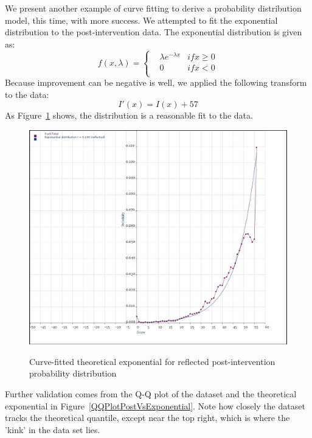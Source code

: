\documentclass[10pt]{article}
\begin{document}
We present another example of curve fitting to derive a probability distribution model, this time, with more success. We attempted to fit the exponential distribution to the post-intervention data. The exponential distribution is given as:
\[f(x,\lambda)=\left\{\begin{matrix}
 & {\lambda}e^{-{\lambda}x} &if x \geq 0\\ 
 & 0 &if x < 0\\
\end{matrix}\right.\]
Because improvement can be negative is well, we applied the following transform to the data:
\[I'(x)=I(x) + 57\]
As Figure~\ref{ExponentialProbabilityPost} shows, the distribution is a reasonable fit to the data.
\begin{figure}
\caption{Curve-fitted theoretical exponential for reflected post-intervention probability distribution}
\label{ExponentialProbabilityPost}
\begin{center}
\includegraphics[width=160mm]{ReportMedia/ExponentialProbabilityPost.jpg}\\
\end{center}
\end{figure}
Further validation comes from the Q-Q plot of the dataset and the theoretical exponential in Figure~\ref{QQPlotPostVsExponential}. Note how closely the dataset tracks the theoretical quantile, except near the top right, which is where the 'kink' in the data set lies.
\end{document}
